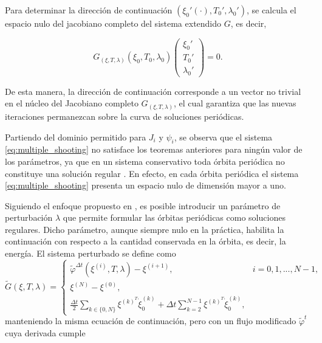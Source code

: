 Para determinar la dirección de continuación
$(\xi_0'(\cdot), T_0', \lambda_0')$, se calcula el espacio nulo del jacobiano completo del sistema extendido $G$, es decir,

\begin{equation}
    G_{(\xi, T, \lambda)}(\xi_0, T_0, \lambda_0)
    \begin{pmatrix}
        \xi_0' \\[1mm] T_0' \\[1mm] \lambda_0'
    \end{pmatrix} = 0.
\end{equation}

De esta manera, la dirección de continuación corresponde a un vector no trivial en el núcleo del Jacobiano
completo $G_{(\xi, T, \lambda)}$, el cual garantiza que las nuevas iteraciones permanezcan sobre la curva de
soluciones periódicas.


Partiendo del dominio permitido para $J_i$ y $\psi_i$, se observa que el sistema
\eqref{eq:multiple_shooting} no satisface los teoremas anteriores para ningún valor de los parámetros,
ya que en un sistema conservativo toda órbita periódica no constituye una solución regular \cite{MUNOZALMARAZ20031}.
En efecto, en cada órbita periódica el sistema \eqref{eq:multiple_shooting} presenta un espacio nulo
de dimensión mayor a uno.

Siguiendo el enfoque propuesto en \cite{MUNOZALMARAZ20031}, es posible introducir un parámetro de perturbación $\lambda$
que permite formular las órbitas periódicas como soluciones regulares. Dicho parámetro, aunque siempre
nulo en la práctica, habilita la continuación con respecto a la cantidad conservada en la órbita, es decir,
la energía. El sistema perturbado se define como
\begin{equation}
    \tilde{G}(\xi, T, \lambda) =
    \begin{cases}
        \tilde{\varphi}^{\Delta t}(\xi^{(i)}, T, \lambda) - \xi^{(i+1)}, & i = 0, 1, ..., N-1 , \\[1mm]
        \xi^{(N)} - \xi^{(0)},                                                                  \\[1mm]
        \frac{\Delta t}{2} \sum_{k \in \{0, N\}} \xi^{(k)^T} \dot{\xi}_{0}^{(k)}
        + \Delta t \sum_{k=2}^{N-1} \xi^{(k)^T} \dot{\xi}_{0}^{(k)},
    \end{cases}
    \label{eq:multiple_shooting_conservative}
\end{equation}
manteniendo la misma ecuación de continuación, pero con un flujo modificado $\tilde{\varphi}^{t}$ cuya
derivada cumple \cite{MUNOZALMARAZ20031}

